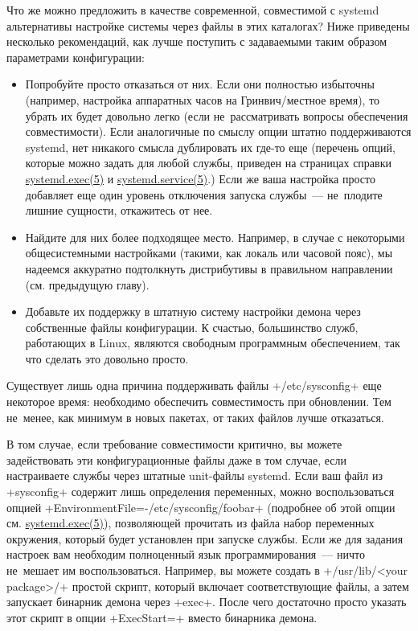 \documentclass[10pt,oneside,a4paper]{article}
\begin{document}
Что же можно предложить в качестве современной, совместимой с systemd
альтернативы настройке системы через файлы в этих каталогах? Ниже приведены
несколько рекомендаций, как лучше поступить с задаваемыми таким образом параметрами
конфигурации:
\begin{itemize}
	\item Попробуйте просто отказаться от них. Если они полностью избыточны (например,
		настройка аппаратных часов на Гринвич/местное время), то убрать
		их будет довольно легко (если не~рассматривать вопросы
		обеспечения совместимости). Если аналогичные по смыслу опции
		штатно поддерживаются systemd, нет никакого смысла дублировать
		их где-то еще (перечень опций, которые можно задать для любой
		службы, приведен на страницах справки
		\href{http://www.freedesktop.org/software/systemd/man/systemd.exec.html}%
		{systemd.exec(5)} и
		\href{http://www.freedesktop.org/software/systemd/man/systemd.service.html}%
		{systemd.service(5)}.)
		Если же ваша настройка просто добавляет еще один уровень
		отключения запуска службы~--- не~плодите лишние сущности,
		откажитесь от нее.
	\item Найдите для них более подходящее место. Например, в случае с
		некоторыми общесистемными настройками (такими, как локаль или
		часовой пояс), мы надеемся аккуратно подтолкнуть дистрибутивы в
		правильном направлении (см. предыдущую главу).
	\item Добавьте их поддержку в штатную систему настройки демона через
		собственные файлы конфигурации. К счастью, большинство служб,
		работающих в Linux, являются свободным программным обеспечением,
		так что сделать это довольно просто.
\end{itemize}

Существует лишь одна причина поддерживать файлы +/etc/sysconfig+ еще некоторое
время: необходимо обеспечить совместимость при обновлении. Тем не~менее, как
минимум в новых пакетах, от таких файлов лучше отказаться.

В том случае, если требование совместимости критично, вы можете задействовать
эти конфигурационные файлы даже в том случае, если настраиваете службы через
штатные unit-файлы systemd. Если ваш файл из +sysconfig+ содержит лишь
определения переменных, можно воспользоваться опцией
+EnvironmentFile=-/etc/sysconfig/foobar+ (подробнее об этой опции см.
\href{http://www.freedesktop.org/software/systemd/man/systemd.exec.html}{systemd.exec(5)}),
позволяющей прочитать из файла набор переменных окружения, который будет
установлен при запуске службы. Если же для задания настроек вам необходим
полноценный язык программирования~--- ничто не~мешает им воспользоваться.
Например, вы можете создать в +/usr/lib/<your package>/+ простой скрипт,
который включает соответствующие файлы, а затем запускает бинарник демона через
+exec+. После чего достаточно просто указать этот скрипт в опции +ExecStart=+
вместо бинарника демона.
\end{document}
